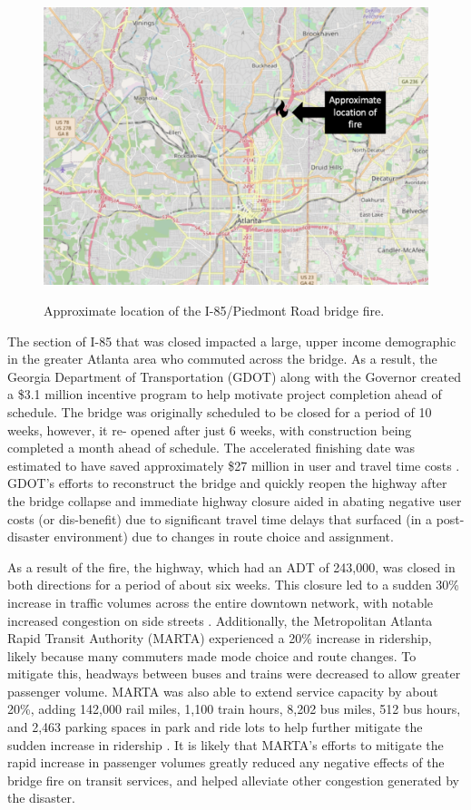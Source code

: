 \begin{figure}
\begin{center}

{\centering \includegraphics[width=0.75\linewidth]{figures/chapter2/I-85.png}}

\caption{Approximate location of the I-85/Piedmont Road bridge fire.}\label{fig:i85}

\end{center}
\end{figure}

The section of I-85 that was closed impacted a large, upper income
demographic in the greater
Atlanta area who commuted across the bridge.
As a result, the Georgia Department of Transportation (GDOT) along with
the Governor created a
\$3.1 million incentive program to help motivate project completion ahead
of schedule. The bridge
was originally scheduled to be closed for a period of 10 weeks, however, it re-
opened after just 6
weeks, with construction being completed a month ahead of schedule. The
accelerated finishing
date was estimated to have saved approximately \$27 million in user and
travel time costs
\citep{GDOT2017}. GDOT’s efforts to reconstruct the bridge and quickly reopen the highway after the
bridge collapse and immediate highway closure aided in abating negative user costs (or dis-benefit) due to significant travel
time delays that surfaced (in a post-disaster environment)
due to changes in route choice and assignment.

As a result of the fire, the highway, which had an ADT of 243,000,
was closed in both directions for a period of about six weeks. This
closure led to a sudden 30\%
increase in traffic volumes across the entire downtown network, with
notable increased congestion on side
streets \citep{hamedi2018}. Additionally, the Metropolitan Atlanta Rapid
Transit Authority
(MARTA) experienced a 20\% increase in ridership, likely because many
commuters made mode choice
and route changes. To mitigate this, headways between buses and trains
were decreased to allow
greater passenger volume. MARTA was also able to extend service capacity by about 20\%, adding 142,000 rail miles, 1,100
train hours, 8,202 bus
miles, 512 bus hours, and 2,463 parking spaces in park and ride lots to
help further mitigate the sudden increase in ridership \citep{marta2017, marta2018}. It is likely that MARTA’s efforts
to mitigate the rapid increase in passenger
volumes greatly reduced any negative effects of the bridge
fire on transit services, and helped alleviate other congestion generated by the disaster.

